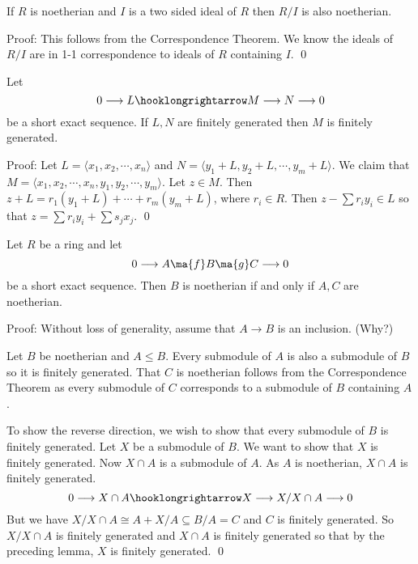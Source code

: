 \begin{thm}
If $R$ is noetherian and $I$ is a two sided ideal of $R$ then $R/I$ is also noetherian.
\end{thm}

Proof: This follows from the Correspondence Theorem. We know the ideals of $R/I$ are in 1-1 correspondence to ideals of $R$ containing $I$. \qed \\

\begin{lem}
Let
\[
0 \longrightarrow L \hooklongrightarrow M \longrightarrow N \longrightarrow 0
\]
be a short exact sequence. If $L,N$ are finitely generated then $M$ is finitely generated. 
\end{lem}

Proof: Let $L=\langle x_1,x_2,\cdots,x_n \rangle$ and $N=\langle y_1+L,y_2+L,\cdots,y_m+L \rangle$. We claim that $M=\langle x_1,x_2,\cdots,x_n,y_1,y_2,\cdots,y_m \rangle$. Let $z \in M$. Then $z+L=r_1(y_1+L)+\cdots+r_m(y_m+L)$, where $r_i \in R$. Then $z-\sum r_iy_i \in L$ so that $z=\sum r_iy_i+\sum s_jx_j$. \qed \\

\begin{thm}
Let $R$ be a ring and let
\[
0 \longrightarrow A \ma{f} B \ma{g} C \longrightarrow 0
\]
be a short exact sequence. Then $B$ is noetherian if and only if $A,C$ are noetherian. 
\end{thm} 

Proof: Without loss of generality, assume that $A \longrightarrow B$ is an inclusion. (Why?)

Let $B$ be noetherian and $A \leq B$. Every submodule of $A$ is also a submodule of $B$ so it is finitely generated. That $C$ is noetherian follows from the Correspondence Theorem as every submodule of $C$ corresponds to a submodule of $B$ containing $A$. 

To show the reverse direction, we wish to show that every submodule of $B$ is finitely generated. Let $X$ be a submodule of $B$. We want to show that $X$ is finitely generated. Now $X \cap A$ is a submodule of $A$. As $A$ is noetherian, $X \cap A$ is finitely generated. 
\[
0 \longrightarrow X \cap A \hooklongrightarrow X \longrightarrow X/X \cap A \longrightarrow 0
\]
But we have $X/X \cap A \cong A+X/A \subseteq B/A=C$ and $C$ is finitely generated. So $X/X \cap A$ is finitely generated and $X \cap A$ is finitely generated so that by the preceding lemma, $X$ is finitely generated. \qed \\

